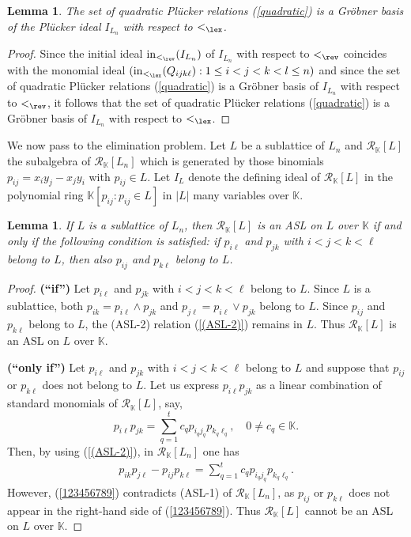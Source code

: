\documentclass[12pt,a4paper]{amsart}
\def\NZQ{\mathbb}               %
\def\KK{{\NZQ K}}
\def\Rc{{\mathcal R}}
\newtheorem{Lemma}[Theorem]{Lemma}
\theoremstyle{definition}
\begin{document}
\begin{Lemma}
\label{lex}
The set of quadratic Pl\"ucker relations (\ref{quadratic}) is a Gr\"obner basis of the Plücker ideal $I_{L_n}$ with respect to $<_{\lex}$. 
\end{Lemma}

\begin{proof}
Since the initial ideal ${\rm in}_{<_{\rev}}(I_{L_n})$ of $I_{L_n}$ with respect to $<_{\rev}$ coincides with the monomial ideal $({\rm in}_{<_{\lex}}(Q_{ijk\ell}): 1\leq i<j<k<l\leq n)$ and since the set of quadratic Pl\"ucker relations (\ref{quadratic}) is a Gr\"obner basis of $I_{L_n}$ with respect to $<_{\rev}$, it follows that the set of quadratic Pl\"ucker relations (\ref{quadratic}) is a Gr\"obner basis of $I_{L_n}$ with respect to $<_{\lex}$.   
\end{proof}  

  

We now pass to the elimination problem. Let $L$ be a sublattice of $L_n$ and $\Rc_\mathbb{K}[L]$ the subalgebra of $\Rc_\mathbb{K}[L_n]$ which is generated by those binomials $p_{ij}=x_iy_j-x_jy_i$ with $p_{ij} \in L$.  Let $I_L$ denote the defining ideal of $\Rc_\mathbb{K}[L]$ in the polynomial ring $\mathbb{K}[p_{ij} : p_{ij} \in L]$ in $|L|$ many variables over $\mathbb{K}$. 

\begin{Lemma}
    \label{sublattice}
If $L$ is a sublattice of $L_n$, then $\Rc_\mathbb{K}[L]$ is an ASL on $L$ over $\mathbb{K}$ if and only if the following condition is satisfied:  if $p_{i\ell}$ and $p_{jk}$ with $i < j < k < \ell$ belong to $L$, then also $p_{ij}$ and $p_{k\ell}$ belong to $L$.  \end{Lemma}

\begin{proof}
 \noindent
{\bf (``if'')} 
Let $p_{i\ell}$ and $p_{jk}$ with $i < j < k < \ell$ belong to $L$.  Since $L$ is a sublattice, both $p_{ik} = p_{i\ell} \wedge p_{jk}$ and $p_{j \ell} = p_{i\ell} \vee p_{jk}$ belong to $L$.  Since $p_{ij}$ and $p_{k\ell}$ belong to $L$, the (ASL-2) relation (\ref{(ASL-2)}) remains in $L$.  Thus $\Rc_\mathbb{K}[L]$ is an ASL on $L$ over $\mathbb{K}$.
\smallskip

\noindent
{\bf (``only if'')} Let $p_{i\ell}$ and $p_{jk}$ with $i < j < k < \ell$ belong to $L$ and suppose that $p_{ij}$ or $p_{k\ell}$ does not belong to $L$.  Let us express $p_{i\ell}p_{jk}$ as a linear combination of standard monomials of $\Rc_\mathbb{K}[L]$, say, 
\[
p_{i\ell}p_{jk} = \sum_{q=1}^{t} c_{q}p_{i_qj_q}p_{k_q\ell_q}, \quad 0 \neq c_{q} \in \KK.
\]
Then, by using (\ref{(ASL-2)}), in $\Rc_\mathbb{K}[L_n]$ one has
\begin{eqnarray}
\label{123456789}   
p_{ik}p_{j\ell} - p_{ij}p_{k\ell} = \sum_{q=1}^{t} c_{q}p_{i_qj_q}p_{k_q\ell_q}.
\end{eqnarray}
However, (\ref{123456789}) contradicts (ASL-1) of $\Rc_\mathbb{K}[L_n]$, as $p_{ij}$ or $p_{k\ell}$ does not appear in the right-hand side of (\ref{123456789}).  Thus $\Rc_\mathbb{K}[L]$ cannot be an ASL on $L$ over $\mathbb{K}$.
\end{proof}
\end{document}
